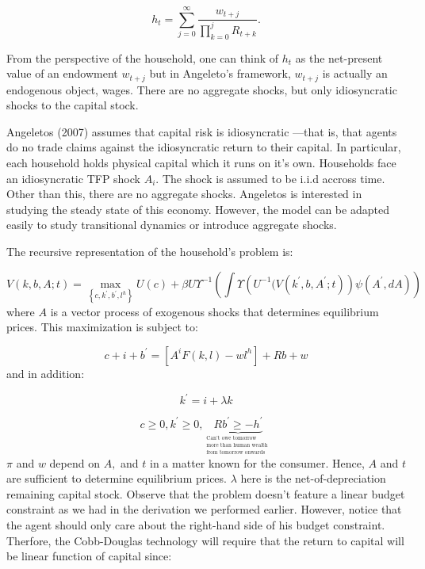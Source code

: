 \documentclass{article}
\begin{document}
\begin{equation*}
h_{t}=\sum_{j=0}^{\infty }\frac{w_{t+j}}{\prod_{k=0}^{j}R_{t+k}}.
\end{equation*}

From the perspective of the household, one can think of $h_{t}$ as the
net-present value of an endowment $w_{t+j}$ but in Angeleto's framework, $%
w_{t+j}$ is actually an endogenous object, wages. There are no aggregate
shocks, but only idiosyncratic shocks to the capital stock.

Angeletos (2007) assumes that capital risk is idiosyncratic ---that is, that
agents do no trade claims against the idiosyncratic return to their capital.
In particular, each household holds physical capital which it runs on it's
own. Households face an idiosyncratic TFP shock $A_{i}.$ The shock is
assumed to be i.i.d accross time. Other than this, there are no aggregate
shocks. Angeletos is interested in studying the steady state of this
economy. However, the model can be adapted easily to study transitional
dynamics or introduce aggregate shocks.

The recursive representation of the household's problem is:

\begin{equation}
V\left( k,b,A;t\right) =\max_{\left\{ c,k^{\prime },b^{\prime
},l^{h}\right\} }U\left( c\right) +\beta U\Upsilon ^{-1}\left( \int \Upsilon
\left( U^{-1}(V\left( k^{\prime },b,A^{\prime };t\right) \right) \psi \left(
A^{\prime },dA\right) \right)
\end{equation}%
where $A$ is a vector process of exogenous shocks that determines
equilibrium prices. This maximization is subject to:

\begin{equation*}
c+i+b^{\prime }=\left[ A^{i}F\left( k,l\right) -wl^{h}\right] +Rb+w
\end{equation*}%
and in addition:

\begin{equation*}
k^{\prime }=i+\lambda k
\end{equation*}

\begin{equation*}
c\geq 0,k^{\prime }\geq 0,\underbrace{Rb^{\prime }\geq -h^{\prime }}_{
_{\substack{ \text{Can't owe tomorrow}  \\ \text{more than human wealth }
\\ \text{from tomorrow onwards}}}}
\end{equation*}%
$\pi $ and $w$ depend on $A,$ and $t$ in a matter known for the consumer.
Hence, $A$ and $t$ are sufficient to determine equilibrium prices. $\lambda $
here is the net-of-depreciation remaining capital stock. Observe that the
problem doesn't feature a linear budget constraint as we had in the
derivation we performed earlier. However, notice that the agent should only
care about the right-hand side of his budget constraint. Therfore, the
Cobb-Douglas technology will require that the return to capital will be
linear function of capital since:
\end{document}

